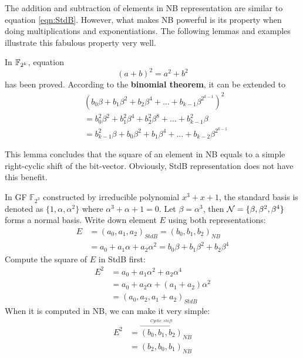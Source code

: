 The addition and subtraction of elements in NB representation are similar to equation \ref{eqn:StdB}.
However, what makes NB powerful is its property when doing multiplications and exponentiations.
The following lemmas and examples illustrate this fabulous property very well.
\begin{Lemma}[Square of NB]
\label{lem:squareNB}
In ${\mathbb{F}}_{2^k}$, equation 
\begin{equation*}
(a+b)^2 = a^2 + b^2
\end{equation*}
has been proved. According to the \textbf{binomial theorem}, it can be extended to
\begin{align*}
&(b_0\beta + b_1\beta^2 + b_2\beta^4 + \dots + b_{k-1}\beta^{2^{k-1}})^2 \\
&= b_0^2\beta^2 + b_1^2\beta^4 + b_2^2\beta^8 + \dots + b_{k-1}^2\beta \\
&= b_{k-1}^2\beta + b_0\beta^2 + b_1\beta^4 + \dots + b_{k-2}\beta^{2^{k-1}}
\end{align*}
\end{Lemma}
This lemma concludes that the square of an element in NB equals to a simple right-cyclic shift of the bit-vector.
Obviously, StdB representation does not have this benefit.

\begin{Example}[Square of NB]
In GF $\mathbb F_{2^3}$ constructed by irreducible polynomial $x^3 + x + 1$, the standard basis is denoted as 
$\{ 1, \alpha, \alpha^2\}$ where $\alpha^3+\alpha+1=0$.
Let $\beta = \alpha^3$, then ${\mathcal{N}} = \{ \beta, \beta^2, \beta^4\}$ forms a normal basis. 
Write down element $E$ using both representations:
\begin{align*}
E &= (a_0,a_1,a_2)_{StdB} = (b_0,b_1,b_2)_{NB} \\
  &= a_0 + a_1\alpha + a_2\alpha^2 = b_0\beta + b_1\beta^2 + b_2\beta^4
\end{align*}
Compute the square of $E$ in StdB first:
\begin{align*}
E^2 &= a_0 + a_1\alpha^2 + a_2\alpha^4 \\
    &= a_0 + a_2\alpha + (a_1 + a_2)\alpha^2 \\
    &= (a_0,a_2,a_1+a_2)_{StdB}
\end{align*}
When it is computed in NB, we can make it very simple:
\begin{align*}
E^2 &= \overset{\xrightarrow{Cyclic~~shift}}{(b_0,b_1,b_2)}_{NB} \\
	&= (b_2,b_0,b_1)_{NB}
\end{align*}
\end{Example}

